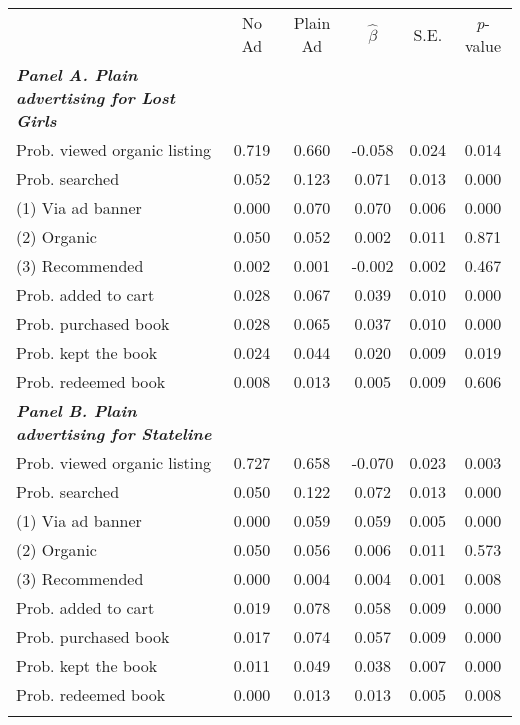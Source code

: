 \begin{center}
\begin{tabular}{lccccc}
\hline \noalign{\smallskip}  & No Ad & Plain Ad & $\hat{\beta}$ & S.E. & \emph{p}-value\\
\noalign{\smallskip}\hline \noalign{\smallskip}\textbf{\emph{Panel A. Plain advertising for Lost Girls}} &  &  &  &  & \\
Prob. viewed organic listing & 0.719 & 0.660 & -0.058 & 0.024 & 0.014\\
Prob. searched & 0.052 & 0.123 & 0.071 & 0.013 & 0.000\\
\hspace{15pt} (1) Via ad banner & 0.000 & 0.070 & 0.070 & 0.006 & 0.000\\
\hspace{15pt} (2) Organic & 0.050 & 0.052 & 0.002 & 0.011 & 0.871\\
\hspace{15pt} (3) Recommended & 0.002 & 0.001 & -0.002 & 0.002 & 0.467\\
Prob. added to cart & 0.028 & 0.067 & 0.039 & 0.010 & 0.000\\
Prob. purchased book & 0.028 & 0.065 & 0.037 & 0.010 & 0.000\\
Prob. kept the book & 0.024 & 0.044 & 0.020 & 0.009 & 0.019\\
Prob. redeemed book & 0.008 & 0.013 & 0.005 & 0.009 & 0.606\\
\textbf{\emph{Panel B. Plain advertising for Stateline}} &  &  &  &  & \\
Prob. viewed organic listing & 0.727 & 0.658 & -0.070 & 0.023 & 0.003\\
Prob. searched & 0.050 & 0.122 & 0.072 & 0.013 & 0.000\\
\hspace{15pt} (1) Via ad banner & 0.000 & 0.059 & 0.059 & 0.005 & 0.000\\
\hspace{15pt} (2) Organic & 0.050 & 0.056 & 0.006 & 0.011 & 0.573\\
\hspace{15pt} (3) Recommended & 0.000 & 0.004 & 0.004 & 0.001 & 0.008\\
Prob. added to cart & 0.019 & 0.078 & 0.058 & 0.009 & 0.000\\
Prob. purchased book & 0.017 & 0.074 & 0.057 & 0.009 & 0.000\\
Prob. kept the book & 0.011 & 0.049 & 0.038 & 0.007 & 0.000\\
Prob. redeemed book & 0.000 & 0.013 & 0.013 & 0.005 & 0.008\\
\noalign{\smallskip}\hline\end{tabular}\\
\end{center}
